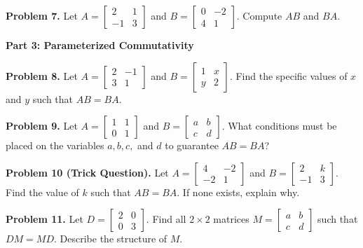 \documentclass[11pt]{article}
\begin{document}
\noindent \textbf{Problem 7.} Let $A = \begin{bmatrix} 2 & 1 \\ -1 & 3 \end{bmatrix}$ and $B = \begin{bmatrix} 0 & -2 \\ 4 & 1 \end{bmatrix}$. Compute $AB$ and $BA$.

\vspace{0.5cm}
\textbf{Part 3: Parameterized Commutativity}
\vspace{0.3cm}

\noindent \textbf{Problem 8.} Let $A = \begin{bmatrix} 2 & -1 \\ 3 & 1 \end{bmatrix}$ and $B = \begin{bmatrix} 1 & x \\ y & 2 \end{bmatrix}$. Find the specific values of $x$ and $y$ such that $AB = BA$.

\noindent \textbf{Problem 9.} Let $A = \begin{bmatrix} 1 & 1 \\ 0 & 1 \end{bmatrix}$ and $B = \begin{bmatrix} a & b \\ c & d \end{bmatrix}$. What conditions must be placed on the variables $a, b, c,$ and $d$ to guarantee $AB = BA$?

\noindent \textbf{Problem 10 (Trick Question).} Let $A = \begin{bmatrix} 4 & -2 \\ -2 & 1 \end{bmatrix}$ and $B = \begin{bmatrix} 2 & k \\ -1 & 3 \end{bmatrix}$. Find the value of $k$ such that $AB = BA$. If none exists, explain why.

\noindent \textbf{Problem 11.} Let $D = \begin{bmatrix} 2 & 0 \\ 0 & 3 \end{bmatrix}$. Find all $2 \times 2$ matrices $M = \begin{bmatrix} a & b \\ c & d \end{bmatrix}$ such that $DM = MD$. Describe the structure of $M$.
\end{document}
